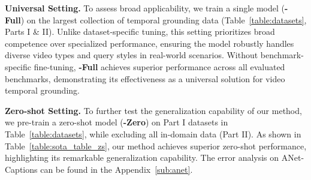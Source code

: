\noindent \textbf{{Universal Setting}.}
To assess broad applicability, we train a single model (\textbf{\Model{}-Full}) on the largest collection of temporal grounding data (Table~\ref{table:datasets}, Parts I \& II).
Unlike dataset-specific tuning, this setting prioritizes broad competence over specialized performance, ensuring the model robustly handles diverse video types and query styles in real-world scenarios.
Without benchmark-specific fine-tuning, \textbf{\Model{}-Full} achieves superior performance across all evaluated benchmarks, demonstrating its effectiveness as a universal solution for video temporal grounding.


\noindent \textbf{Zero-shot Setting.}
To further test the generalization capability of our method, we pre-train a zero-shot model (\textbf{\Model{}-Zero}) on Part I datasets in Table~\ref{table:datasets}, while excluding all in-domain data (Part II).
As shown in Table~\ref{table:sota_table_zs}, our method achieves superior zero-shot performance, highlighting its remarkable generalization capability. The error analysis on ANet-Captions can be found in the Appendix~\ref{sub:anet}.


